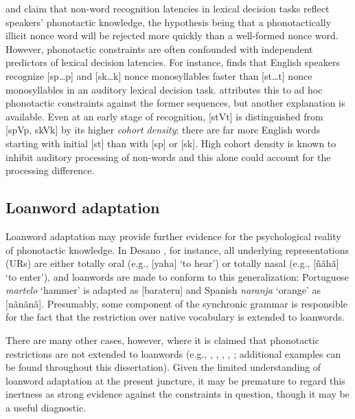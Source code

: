 \citet{Berent2001b} and \citet{Coetzee2008b} claim that non-word recognition latencies in lexical decision tasks reflect speakers' phonotactic knowledge, the hypothesis being that a phonotactically illicit nonce word will be rejected more quickly than a well-formed nonce word.
However, phonotactic constraints are often confounded with independent predictors of lexical decision latencies.
For instance, \citet{Coetzee2008b} finds that English speakers recognize [sp\ldots{}p] and [sk\ldots{}k] nonce monosyllables faster than [st\ldots{}t] nonce monosyllables in an auditory lexical decision task.
\citeauthor{Coetzee2008b} attributes this to ad hoc phonotactic constraints against the former sequences, but another explanation is available.
Even at an early stage of recognition, [stVt] is distinguished from [spVp, skVk] by its higher \emph{cohort density}: there are far more English words starting with initial [st] than with [sp] or [sk].
High cohort density is known to inhibit auditory processing of non-words \citep[e.g.,][]{Marslen-Wilson1978} and this alone could account for the processing difference.

\subsection{Loanword adaptation}

Loanword adaptation may provide further evidence for the psychological reality of phonotactic knowledge.
In Desano \citep{Kaye1974}, for instance, all underlying representations (URs) are either totally oral (e.g., [yaha] `to hear') or totally nasal (e.g., [ñãhã] `to enter'), and loanwords are made to conform to this generalization: Portuguese \emph{martelo} `hammer' is adapted as [barateru] and Spanish \emph{naranja} `orange' as [nãnãnã].
Presumably, some component of the synchronic grammar is responsible for the fact that the restriction over native vocabulary is extended to loanwords.

There are many other cases, however, where it is claimed that phonotactic restrictions are not extended to loanwords (e.g., \citealt{Clements1982}, \citealt[75]{Davidson1997}, \citealt[95]{Shibatani1973}, \citealt{Ussishkin2003}, \citealt{Vogt1954}; additional examples can be found throughout this dissertation).
Given the limited understanding of loanword adaptation at the present juncture, it may be premature to regard this inertness as strong evidence against the constraints in question, though it may be a useful diagnostic.

